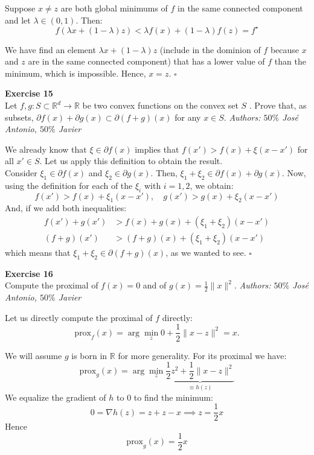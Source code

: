 \documentclass[11pt,table]{article}
\newcommand{\qed}{\hfill $\square$}
\newenvironment{problem}[2][Exercise]
{ \begin{mdframed}[backgroundcolor=gray!20] \textbf{#1 #2} \\}
	{\hspace{0.0cm}\newline\newline \emph{Authors: \(50\%\) José Antonio, \(50\%\) Javier}  \end{mdframed}}
\newcommand\R{\mathbb R}
\begin{document}
Suppose $x \neq z$ are both global minimums of $f$ in the same connected component and let $\lambda \in (0,1)$. Then:
\[
	f(\lambda x + (1-\lambda)z) < \lambda f(x) + (1-\lambda) f(z) = f^\star
\]

We have find an element $\lambda x + (1-\lambda)z$ (include in the dominion of $f$ because $x$ and $z$ are in the same connected component) that has a lower value of $f$ than the minimum, which is impossible. Hence, $x = z$. \qed \\

\begin{problem}{15}
Let \( f,g: S \subset \mathbb{R}^d \to \mathbb{R} \)  be two convex functions on the convex set \( S \) . Prove that, as subsets, \(  \partial f(x) + \partial g(x) \subset \partial(f+g)(x) \) for any $x\in S$.
\end{problem}

We already know that \(\xi \in \partial f(x)\) implies that \(f(x') > f(x) + \xi(x-x')\) for all \(x' \in S\). Let us apply this definition to obtain the result.\\
Consider \(\xi_1 \in \partial f(x)\) and \(\xi_2 \in \partial g(x)\). Then, \(\xi_1 + \xi_2 \in \partial f(x) + \partial g(x)\). Now, using the definition for each of the \(\xi_i\) with \(i = 1,2\), we obtain:
\[
	f(x') > f(x) + \xi_1 (x-x'), \quad g(x') > g(x) + \xi_2(x-x')
\]
And, if we add both inequalities:
\begin{align*}
	f(x') + g(x')        & > f(x) + g(x) + (\xi_1 + \xi_2)(x-x')        \\
	\left(f+g\right)(x') & >\left(f+g\right)(x) + (\xi_1 + \xi_2)(x-x')
\end{align*}
which means that \(\xi_1 + \xi_2 \in \partial \left(f+g\right)(x) \), as we wanted to see. \qed \\

\begin{problem}{16}
Compute the proximal of \( f(x) = 0 \) and of \( g(x) = \frac{1}{2}\|x\|^2 \).
\end{problem}

Let us directly compute the proximal of $f$ directly:
\[
	\text{prox}_f(x) = \arg \min_z 0 + \frac{1}{2} \parallel x - z \parallel^2 = x.
\]

We will assume $g$ is born in $\R$ for more generality. For its proximal we have:
\[
	\text{prox}_g(x) = \arg \min_z \underbrace{\frac{1}{2}z^2 + \frac{1}{2} \parallel x - z \parallel^2}_{\equiv h(z)}
\]
We equalize the gradient of $h$ to $0$ to find the minimum:
\[
	0 = \nabla h(z) = z + z - x \implies z = \frac{1}{2}x
\]
Hence
\[
	\text{prox}_g(x) =  \frac{1}{2} x
\] \\
\end{document}
